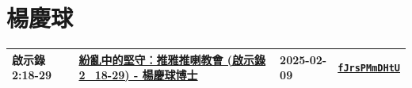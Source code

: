 \documentclass{book}
\begin{document}
\newpage



\chapter{楊慶球}\label{ch:preacher7}
\begin{multicols}{3}
\minitoc
\end{multicols}
{ \scriptsize


\begin{xltabular}{\textwidth}{|p{0.15\textwidth} p{0.6\textwidth}|p{0.07\textwidth} p{0.1\textwidth}|}
\hline
啟示錄 2:18-29 & \hyperref[sec:fJrsPMmDHtU]{紛亂中的堅守︰推雅推喇教會 (啟示錄2\_18-29) - 楊慶球博士} & 2025-02-09 & \href{https://youtube.com/watch?v=fJrsPMmDHtU}{\texttt{fJrsPMmDHtU}} \\
\hline
\end{xltabular}
}
\newpage
\end{document}

